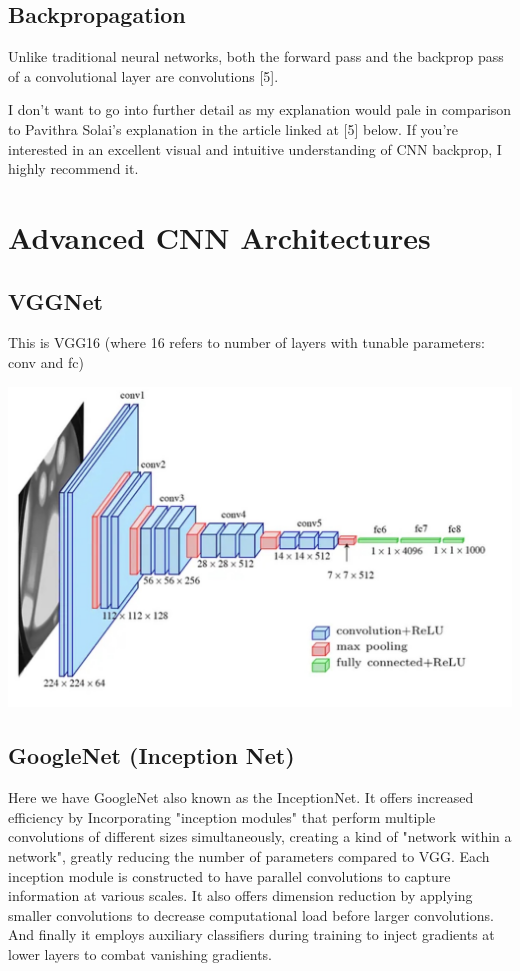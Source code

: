 \documentclass{article}
\begin{document}
    \subsection{Backpropagation}
        Unlike traditional neural networks, both the forward pass and the backprop pass of a convolutional layer are convolutions [5].

        I don't want to go into further detail as my explanation would pale in comparison to Pavithra Solai's explanation in the article linked at [5] below. If you're interested in an excellent visual and intuitive understanding of CNN backprop, I highly recommend it.
        
\section{Advanced CNN Architectures}
    \subsection{VGGNet}
        This is VGG16 (where 16 refers to number of layers with tunable parameters: conv and fc)
        
        \begin{center}
            \includegraphics[scale=0.4]{images/VGG.jpg}
        \end{center}

    \subsection{GoogleNet (Inception Net)}
        Here we have GoogleNet also known as the InceptionNet. It offers increased efficiency by Incorporating "inception modules" that perform multiple convolutions of different sizes simultaneously, creating a kind of "network within a network", greatly reducing the number of parameters compared to VGG. Each inception module is constructed to have parallel convolutions to capture information at various scales. It also offers dimension reduction by applying smaller convolutions to decrease computational load before larger convolutions. And finally it employs auxiliary classifiers during training to inject gradients at lower layers to combat vanishing gradients.
\end{document}
